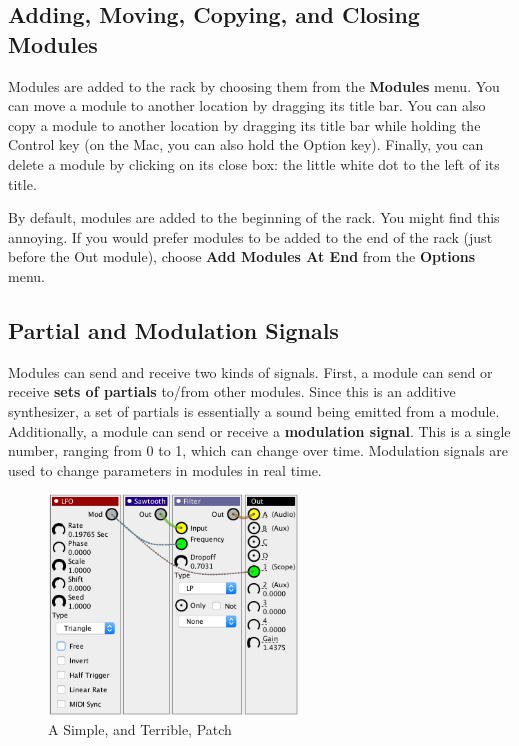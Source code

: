 \documentclass{article}
\begin{document}
\subsection{Adding, Moving, Copying, and Closing Modules}  Modules are added to the rack by choosing them from the {\bf Modules} menu.  You can move a module to another location by dragging its title bar.  You can also copy a module to another location by dragging its title bar while holding the Control key (on the Mac, you can also hold the Option key).  Finally, you can delete a module by clicking on its close box: the little white dot to the left of its title.

By default, modules are added to the beginning of the rack.  You might find this annoying.  If you would prefer modules to be added to the end of the rack (just before the Out module), choose {\bf Add Modules At End} from the {\bf Options} menu.

\subsection{Partial and Modulation Signals}  Modules can send and receive two kinds of signals.  First, a module can send or receive {\bf sets of partials} to/from other modules.  Since this is an additive synthesizer, a set of partials is essentially a sound being emitted from a module.  Additionally, a module can send or receive a {\bf modulation signal}.  This is a single number, ranging from 0 to 1, which can change over time.  Modulation signals are used to change parameters in modules in real time.  

\begin{figure}
\vspace{-1em}
\includegraphics[width=2.6in]{simplepatch.png}
\caption{A Simple, and Terrible, Patch}
\vspace{-1em}
\label{simplepatch}
\end{figure}
\end{document}
